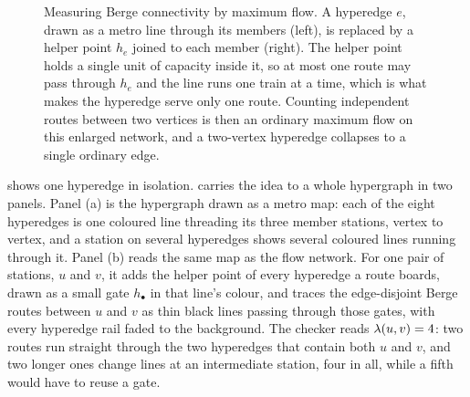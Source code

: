 \begin{figure}[ht]
\centering
{}
\caption{Measuring Berge connectivity by maximum flow. A hyperedge $e$, drawn as a metro line through its members (left), is replaced by a helper point $h_e$ joined to each member (right). The helper point holds a single unit of capacity inside it, so at most one route may pass through $h_e$ and the line runs one train at a time, which is what makes the hyperedge serve only one route. Counting independent routes between two vertices is then an ordinary maximum flow on this enlarged network, and a two-vertex hyperedge collapses to a single ordinary edge.}
\label{fig:hyper-gadget}
\end{figure}

 shows one hyperedge in isolation.  carries the idea to a whole hypergraph in two panels. Panel (a) is the hypergraph drawn as a metro map: each of the eight hyperedges is one coloured line threading its three member stations, vertex to vertex, and a station on several hyperedges shows several coloured lines running through it. Panel (b) reads the same map as the flow network. For one pair of stations, $u$ and $v$, it adds the helper point of every hyperedge a route boards, drawn as a small gate $h_{\bullet}$ in that line's colour, and traces the edge-disjoint Berge routes between $u$ and $v$ as thin black lines passing through those gates, with every hyperedge rail faded to the background. The checker reads $\lambda(u, v) = 4$: two routes run straight through the two hyperedges that contain both $u$ and $v$, and two longer ones change lines at an intermediate station, four in all, while a fifth would have to reuse a gate.

